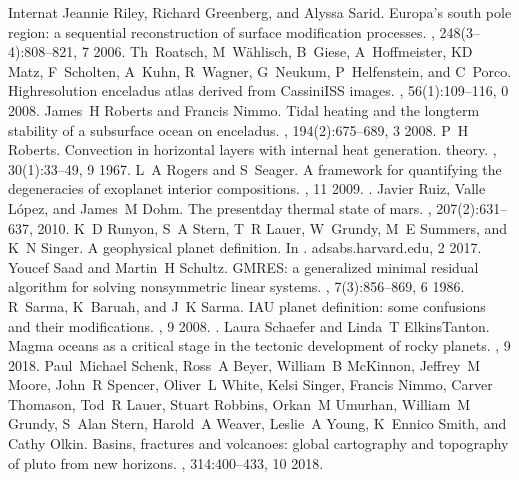 \documentclass[letterpaper,10pt,english]{jupyterBook}
\begin{document}
\begin{sphinxthebibliography}{Internat}
\sphinxAtStartPar
Jeannie Riley, Richard Greenberg, and Alyssa Sarid. Europa's south pole region: a sequential reconstruction of surface modification processes. , 248(3–4):808–821, 7 2006.
\sphinxAtStartPar
Th Roatsch, M Wählisch, B Giese, A Hoffmeister, K\sphinxhyphen{}D Matz, F Scholten, A Kuhn, R Wagner, G Neukum, P Helfenstein, and C Porco. High\sphinxhyphen{}resolution enceladus atlas derived from Cassini\sphinxhyphen{}ISS images. , 56(1):109–116, 0 2008.
\sphinxAtStartPar
James H Roberts and Francis Nimmo. Tidal heating and the long\sphinxhyphen{}term stability of a subsurface ocean on enceladus. , 194(2):675–689, 3 2008.
\sphinxAtStartPar
P H Roberts. Convection in horizontal layers with internal heat generation. theory. , 30(1):33–49, 9 1967.
\sphinxAtStartPar
L A Rogers and S Seager. A framework for quantifying the degeneracies of exoplanet interior compositions. , 11 2009. .
\sphinxAtStartPar
Javier Ruiz, Valle López, and James M Dohm. The present\sphinxhyphen{}day thermal state of mars. , 207(2):631–637, 2010.
\sphinxAtStartPar
K D Runyon, S A Stern, T R Lauer, W Grundy, M E Summers, and K N Singer. A geophysical planet definition. In . adsabs.harvard.edu, 2 2017.
\sphinxAtStartPar
Youcef Saad and Martin H Schultz. GMRES: a generalized minimal residual algorithm for solving nonsymmetric linear systems. , 7(3):856–869, 6 1986.
\sphinxAtStartPar
R Sarma, K Baruah, and J K Sarma. IAU planet definition: some confusions and their modifications. , 9 2008. .
\sphinxAtStartPar
Laura Schaefer and Linda T Elkins\sphinxhyphen{}Tanton. Magma oceans as a critical stage in the tectonic development of rocky planets. , 9 2018.
\sphinxAtStartPar
Paul Michael Schenk, Ross A Beyer, William B McKinnon, Jeffrey M Moore, John R Spencer, Oliver L White, Kelsi Singer, Francis Nimmo, Carver Thomason, Tod R Lauer, Stuart Robbins, Orkan M Umurhan, William M Grundy, S Alan Stern, Harold A Weaver, Leslie A Young, K Ennico Smith, and Cathy Olkin. Basins, fractures and volcanoes: global cartography and topography of pluto from new horizons. , 314:400–433, 10 2018.

\end{sphinxthebibliography}
\end{document}
